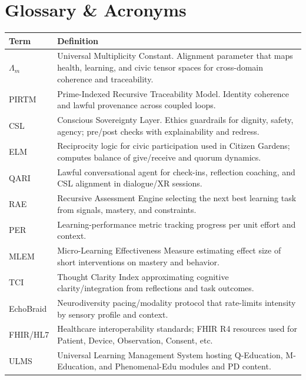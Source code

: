 \documentclass[11pt]{article}
\theoremstyle{plain}
\begin{document}
\newpage


\section{Glossary \& Acronyms}
\begin{tabularx}{\textwidth}{@{} l X @{}}
\toprule
\textbf{Term} & \textbf{Definition} \\
\midrule
\(\Lambda_m\) & Universal Multiplicity Constant. Alignment parameter that maps health, learning, and civic tensor spaces for cross-domain coherence and traceability. \\
PIRTM & Prime-Indexed Recursive Traceability Model. Identity coherence and lawful provenance across coupled loops. \\
CSL & Conscious Sovereignty Layer. Ethics guardrails for dignity, safety, agency; pre/post checks with explainability and redress. \\
ELM & Reciprocity logic for civic participation used in Citizen Gardens; computes balance of give/receive and quorum dynamics. \\
QARI & Lawful conversational agent for check-ins, reflection coaching, and CSL alignment in dialogue/XR sessions. \\
RAE & Recursive Assessment Engine selecting the next best learning task from signals, mastery, and constraints. \\
PER & Learning-performance metric tracking progress per unit effort and context. \\
MLEM & Micro-Learning Effectiveness Measure estimating effect size of short interventions on mastery and behavior. \\
TCI & Thought Clarity Index approximating cognitive clarity/integration from reflections and task outcomes. \\
EchoBraid & Neurodiversity pacing/modality protocol that rate-limits intensity by sensory profile and context. \\
FHIR/HL7 & Healthcare interoperability standards; FHIR R4 resources used for Patient, Device, Observation, Consent, etc. \\
ULMS & Universal Learning Management System hosting Q-Education, M-Education, and Phenomenal-Edu modules and PD content. \\
\bottomrule
\end{tabularx}


\newpage


\nocite{*}


\end{document}
